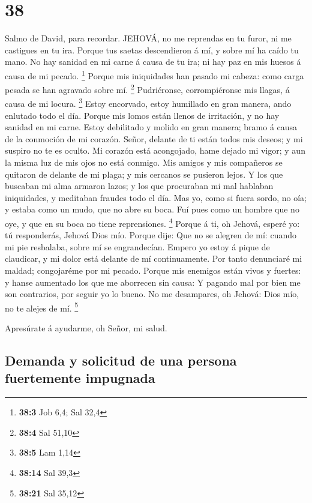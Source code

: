 \hypertarget{section-37}{%
\section{38}\label{section-37}}

 Salmo de David, para recordar. JEHOVÁ, no me reprendas en
tu furor, ni me castigues en tu ira.  Porque tus saetas
descendieron á mí, y sobre mí ha caído tu mano.  No hay
sanidad en mi carne á causa de tu ira; ni hay paz en mis huesos á causa
de mi pecado. \footnote{\textbf{38:3} Job 6,4; Sal 32,4} 
Porque mis iniquidades han pasado mi cabeza: como carga pesada se han
agravado sobre mí. \footnote{\textbf{38:4} Sal 51,10} 
Pudriéronse, corrompiéronse mis llagas, á causa de mi locura.
\footnote{\textbf{38:5} Lam 1,14}  Estoy encorvado, estoy
humillado en gran manera, ando enlutado todo el día.  Porque
mis lomos están llenos de irritación, y no hay sanidad en mi carne.
 Estoy debilitado y molido en gran manera; bramo á causa de
la conmoción de mi corazón.  Señor, delante de ti están
todos mis deseos; y mi suspiro no te es oculto.  Mi corazón
está acongojado, hame dejado mi vigor; y aun la misma luz de mis ojos no
está conmigo.  Mis amigos y mis compañeros se quitaron de
delante de mi plaga; y mis cercanos se pusieron lejos.  Y
los que buscaban mi alma armaron lazos; y los que procuraban mi mal
hablaban iniquidades, y meditaban fraudes todo el día.  Mas
yo, como si fuera sordo, no oía; y estaba como un mudo, que no abre su
boca.  Fuí pues como un hombre que no oye, y que en su boca
no tiene reprensiones. \footnote{\textbf{38:14} Sal 39,3} 
Porque á ti, oh Jehová, esperé yo: tú responderás, Jehová Dios mío.
 Porque dije: Que no se alegren de mí: cuando mi pie
resbalaba, sobre mí se engrandecían.  Empero yo estoy á
pique de claudicar, y mi dolor está delante de mí continuamente.
 Por tanto denunciaré mi maldad; congojaréme por mi pecado.
 Porque mis enemigos están vivos y fuertes: y hanse
aumentado los que me aborrecen sin causa:  Y pagando mal
por bien me son contrarios, por seguir yo lo bueno.  No me
desampares, oh Jehová: Dios mío, no te alejes de mí. \footnote{\textbf{38:21}
  Sal 35,12}

 Apresúrate á ayudarme, oh Señor, mi salud.

\hypertarget{demanda-y-solicitud-de-una-persona-fuertemente-impugnada}{%
\subsection{Demanda y solicitud de una persona fuertemente
impugnada}\label{demanda-y-solicitud-de-una-persona-fuertemente-impugnada}}

